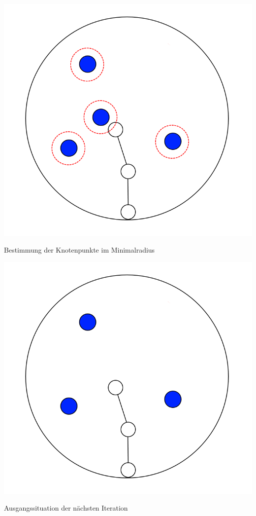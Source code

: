 \newpage
\begin{center}
	\includegraphics[height=.9\textheight]{images/CH3_SCA_Basic5.png}
	
	Bestimmung der Knotenpunkte im Minimalradius
\end{center}





\newpage
\begin{center}
	\includegraphics[height=.9\textheight]{images/CH3_SCA_Basic6.png}
	
	Ausgangssituation der nächsten Iteration
\end{center}




